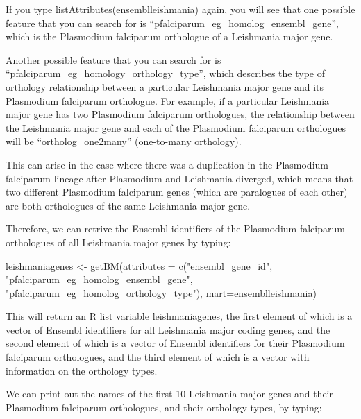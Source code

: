 \documentclass[
]{book}
\newenvironment{Shaded}{\begin{snugshade}}{\end{snugshade}}
\newcommand{\AttributeTok}[1]{\textcolor[rgb]{0.77,0.63,0.00}{#1}}
\newcommand{\FunctionTok}[1]{\textcolor[rgb]{0.00,0.00,0.00}{#1}}
\newcommand{\NormalTok}[1]{#1}
\newcommand{\OtherTok}[1]{\textcolor[rgb]{0.56,0.35,0.01}{#1}}
\newcommand{\StringTok}[1]{\textcolor[rgb]{0.31,0.60,0.02}{#1}}
\begin{document}
If you type listAttributes(ensemblleishmania) again, you will see that one possible feature that you can search for is ``pfalciparum\_eg\_homolog\_ensembl\_gene'', which is the Plasmodium falciparum orthologue of a Leishmania major gene.

Another possible feature that you can search for is ``pfalciparum\_eg\_homology\_orthology\_type'', which describes the type of orthology relationship between a particular Leishmania major gene and its Plasmodium falciparum orthologue. For example, if a particular Leishmania major gene has two Plasmodium falciparum orthologues, the relationship between the Leishmania major gene and each of the Plasmodium falciparum orthologues will be ``ortholog\_one2many'' (one-to-many orthology).

This can arise in the case where there was a duplication in the Plasmodium falciparum lineage after Plasmodium and Leishmania diverged, which means that two different Plasmodium falciparum genes (which are paralogues of each other) are both orthologues of the same Leishmania major gene.

Therefore, we can retrive the Ensembl identifiers of the Plasmodium falciparum orthologues of all Leishmania major genes by typing:

\begin{Shaded}
\begin{Highlighting}[]
\NormalTok{leishmaniagenes }\OtherTok{\textless{}{-}} \FunctionTok{getBM}\NormalTok{(}\AttributeTok{attributes =} \FunctionTok{c}\NormalTok{(}\StringTok{"ensembl\_gene\_id"}\NormalTok{, }\StringTok{"pfalciparum\_eg\_homolog\_ensembl\_gene"}\NormalTok{,}
   \StringTok{"pfalciparum\_eg\_homolog\_orthology\_type"}\NormalTok{), }\AttributeTok{mart=}\NormalTok{ensemblleishmania)}
\end{Highlighting}
\end{Shaded}

This will return an R list variable leishmaniagenes, the first element of which is a vector of Ensembl identifiers for all Leishmania major coding genes, and the second element of which is a vector of Ensembl identifiers for their Plasmodium falciparum orthologues, and the third element of which is a vector with information on the orthology types.

We can print out the names of the first 10 Leishmania major genes and their Plasmodium falciparum orthologues, and their orthology types, by typing:
\end{document}
